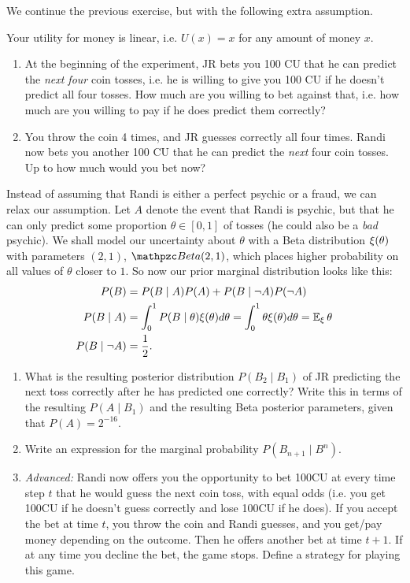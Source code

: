 \documentclass[twoside,a4paper]{article}
\begin{document}
\begin{exercise}
  We continue the previous exercise, but with the following extra assumption.
  \begin{assumption}
    Your utility for money is linear, i.e. $U(x) = x$ for
    any amount of money $x$.
  \end{assumption}     
  \begin{enumerate}  
  \item At the beginning of the experiment, JR bets you 100 CU that he can predict the \emph{next four} coin tosses, i.e. he is willing to give you 100 CU if he doesn't predict all four tosses. How much are you willing to bet against that, i.e. how much are you willing to pay if he does predict them correctly?
  \item You throw the coin 4 times, and JR guesses correctly all four
    times. Randi now bets you another 100 CU that he can predict the
    \emph{next} four coin tosses. Up to how much would you bet now?
  \end{enumerate}
\end{exercise}

\begin{exercise}
  Instead of assuming that Randi is either a perfect psychic or a fraud, we can relax our assumption. Let $A$ denote the event that Randi is psychic, but that he can only predict some proportion $\theta \in [0,1]$ of tosses (he could also be a \emph{bad} psychic).
We shall model our uncertainty about $\theta$ with a Beta distribution $\xi(\theta)$ with parameters $(2, 1)$, $\Beta(2,1)$, which places higher probability on all values of $\theta$ closer to $1$. So now our prior marginal distribution looks like this:
\begin{align}
  P(B) &= P(B \mid A) P(A) + P(B \mid \neg A) P(\neg A)\\
  P(B \mid A) &= \int_0^1 P(B \mid \theta) \xi(\theta) d\theta = \int_0^1 \theta \xi(\theta) d\theta = \mathop{\mbox{\ensuremath{\mathbb{E}}}}\nolimits_\xi \theta\\
  P(B \mid \neg A) &= \frac{1}{2}.
\end{align}
\begin{enumerate}
\item What is the resulting posterior distribution $P(B_2 \mid B_1)$ of JR predicting the next toss correctly after he has predicted one correctly? Write this in terms of the resulting $P(A \mid B_1)$ and the resulting Beta posterior parameters, given that $P(A) = 2^{-16}$.
\item Write an expression for the marginal probability $P(B_{n+1} \mid B^n)$.
\item \emph{Advanced:} Randi now offers you the opportunity to bet 100CU at every time step $t$ that he would guess the next coin toss, with equal odds (i.e. you get 100CU if he doesn't guess correctly and lose 100CU if he does). If you accept the bet at time $t$, you throw the coin and Randi guesses, and you get/pay money depending on the outcome. Then he offers another bet at time $t+1$. If at any time you decline the bet, the game stops. Define a strategy for playing this game.
\end{enumerate}

\end{exercise}
\end{document}
